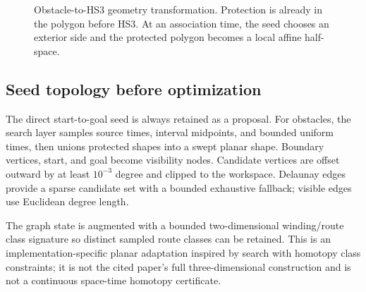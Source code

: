 \documentclass[10pt,letterpaper]{article}
\begin{document}
\begin{figure}[!htbp]
\caption{Obstacle-to-HS3 geometry transformation. Protection is already in
the polygon before HS3. At an association time, the seed chooses an exterior
side and the protected polygon becomes a local affine half-space.}
\label{fig:obstaclepipeline}
\end{figure}
\clearpage

\subsection{Seed topology before optimization}

The direct start-to-goal seed is always retained as a proposal. For obstacles,
the search layer samples source times, interval midpoints, and bounded uniform
times, then unions protected shapes into a swept planar shape. Boundary
vertices, start, and goal become visibility nodes. Candidate vertices are
offset outward by at least $10^{-3}$ degree and clipped to the workspace.
Delaunay edges provide a sparse candidate set with a bounded exhaustive
fallback; visible edges use Euclidean degree length.

The graph state is augmented with a bounded two-dimensional winding/route class
signature so distinct sampled route classes can be retained. This is an
implementation-specific planar adaptation inspired by search with homotopy
class constraints\cite{bhattacharya2012}; it is not the cited paper's full
three-dimensional construction and is not a continuous space-time homotopy
certificate.
\end{document}
